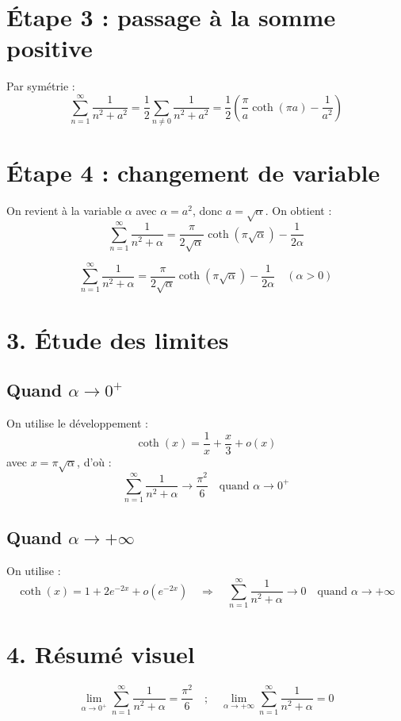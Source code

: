 \documentclass[a4paper,11pt]{article}
\begin{document}
\section*{Étape 3 : passage à la somme positive}
Par symétrie :
\[
\sum_{n=1}^{\infty} \frac{1}{n^2 + a^2}
= \frac{1}{2} \sum_{n\neq 0} \frac{1}{n^2 + a^2}
= \frac{1}{2} \left( \frac{\pi}{a} \coth(\pi a) - \frac{1}{a^2} \right)
\]

\section*{Étape 4 : changement de variable}
On revient à la variable \( \alpha \) avec \( \alpha = a^2 \), donc \( a = \sqrt{\alpha} \). On obtient :
\[
\sum_{n=1}^{\infty} \frac{1}{n^2 + \alpha}
= \frac{\pi}{2\sqrt{\alpha}} \coth(\pi \sqrt{\alpha}) - \frac{1}{2\alpha}
\]

\[
\boxed{
\sum_{n=1}^{\infty} \frac{1}{n^2 + \alpha}
= \frac{\pi}{2\sqrt{\alpha}} \coth(\pi \sqrt{\alpha}) - \frac{1}{2\alpha}
\quad (\alpha > 0)
}
\]

\section*{3. Étude des limites}

\subsection*{Quand \( \alpha \to 0^+ \)}

On utilise le développement :
\[
\coth(x) = \frac{1}{x} + \frac{x}{3} + o(x)
\]
avec \( x = \pi \sqrt{\alpha} \), d'où :
\[
\sum_{n=1}^{\infty} \frac{1}{n^2 + \alpha} \to \frac{\pi^2}{6}
\quad \text{quand } \alpha \to 0^+
\]

\subsection*{Quand \( \alpha \to +\infty \)}

On utilise :
\[
\coth(x) = 1 + 2e^{-2x} + o(e^{-2x})
\quad \Rightarrow \quad
\sum_{n=1}^{\infty} \frac{1}{n^2 + \alpha} \to 0
\quad \text{quand } \alpha \to +\infty
\]

\section*{4. Résumé visuel}

\[
\boxed{
\lim_{\alpha \to 0^+} \sum_{n=1}^{\infty} \frac{1}{n^2 + \alpha} = \frac{\pi^2}{6}
\quad ; \quad
\lim_{\alpha \to +\infty} \sum_{n=1}^{\infty} \frac{1}{n^2 + \alpha} = 0
}
\]
\end{document}
